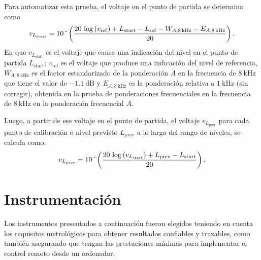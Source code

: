 Para automatizar esta prueba, el voltaje en el punto de partida se determina como
%
\begin{equation}
    \label{eq:voltaje_start_point}
    v_{L_{\mathrm{start}}} = 10\,\hat{\mkern6mu}
    \left(\frac{20\,\log\left(v_{\mathrm{ref}}\right) +
    L_{\mathrm{start}} - L_{\mathrm{ref}} -
    W_{A,\qty{8}{\kHz}} - E_{A,\qty{8}{\kHz}}}{20}\right).
\end{equation}
%
En que $v_{L_{\mathrm{start}}}$ es el voltaje que causa una indicación del nivel en el punto de partida $L_{\mathrm{start}}$; $v_{\mathrm{ref}}$ es el voltaje que produce una indicación del nivel de referencia, $W_{A,\qty{8}{\kHz}}$ es el factor estandarizado de la ponderación $A$ en la frecuencia de $\qty{8}{\kHz}$ que tiene el valor de $\qty{-1.1}{\dB}$ y $E_{A,\qty{8}{\kHz}}$ es la ponderación relativa a $\qty{1}{\kHz}$ (sin corregir), obtenida en la prueba de ponderaciones frecuenciales en la frecuencia de $\qty{8}{\kHz}$ en la ponderación frecuencial $A$.%

Luego, a partir de ese voltaje en el punto de partida, el voltaje $v_{L_{\mathrm{prev}}}$ para cada punto de calibración o nivel previsto $L_{\mathrm{prev}}$ a lo largo del rango de niveles, se calcula como:
%
\begin{equation}
    \label{eq:voltage_linearity}
    v_{L_{\mathrm{prev}}} = 10\,\hat{\mkern6mu}
    \left(\frac{20\,\log\left(v_{L_{\mathrm{start}}}\right) + L_{\mathrm{prev}} - L_{\mathrm{start}}}{20}\right).
\end{equation}


\section{Instrumentación}\label{sec:instrumentacion}

Los instrumentos presentados a continuación fueron elegidos teniendo en cuenta los requisitos metrológicos para obtener resultados confiables y trazables, como también asegurando que tengan las prestaciones mínimas para implementar el control remoto desde un ordenador.


